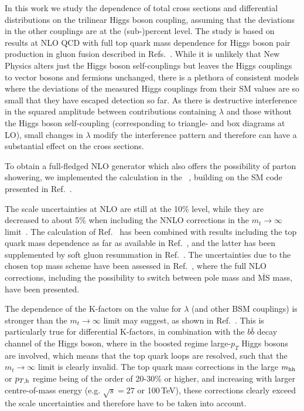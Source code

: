 \medskip

In this work we study the dependence of total cross sections and differential distributions on the trilinear Higgs boson coupling, assuming that the deviations in the other couplings are at the (sub-)percent level.
The study is based on results at NLO QCD with full top quark mass dependence for Higgs boson pair production in gluon fusion described in Refs.~\cite{Borowka:2016ehy,Borowka:2016ypz}. 
While it is unlikely that New Physics alters just the Higgs boson self-couplings but leaves the Higgs couplings to vector bosons and fermions unchanged, there is a plethora of consistent models where the deviations of the measured Higgs couplings from their SM values are so small that they have escaped detection so far. 
As there is destructive interference in the squared amplitude between contributions containing $\lambda$ and those without the Higgs boson self-coupling (corresponding to triangle- and box diagrams at LO), 
small changes in $\lambda$ modify the interference pattern and therefore can have a substantial effect on the cross sections.

To obtain a full-fledged NLO generator which also offers the possibility of parton showering, we implemented the calculation in the 
\powhegbox~\cite{Nason:2004rx,Frixione:2007vw,Alioli:2010xd}, building on the SM code presented in Ref.~\cite{Heinrich:2017kxx}.

The scale uncertainties at NLO are still at the 10\% level, while they are decreased to about 5\% when including the NNLO corrections
in the $m_t\to\infty$ limit~\cite{deFlorian:2013jea,Grigo:2015dia,deFlorian:2016uhr}. The calculation of Ref.~\cite{deFlorian:2016uhr} has been combined with results including the top quark mass dependence as far as available in Ref.~\cite{Grazzini:2018bsd}, and the latter has been supplemented by soft gluon resummation in Ref.~\cite{deFlorian:2018tah}. 
The uncertainties due to the chosen top mass scheme have been assessed in Ref.~\cite{Baglio:2018lrj}, where the full NLO corrections, including the possibility to switch between pole mass and $\overline{\mathrm{MS}}$ mass, have been presented.

The dependence of the K-factors on the value for $\lambda$ (and other BSM couplings) is stronger than the $m_t\to\infty$ limit may suggest, as shown in Ref.~\cite{Buchalla:2018yce}. This is particularly true for differential K-factors, 
in combination with the $b\bar{b}$ decay channel of the Higgs boson, where in the boosted regime large-$p_T$ Higgs bosons are involved, which means that the top quark loops are resolved, such that the  $m_t\to\infty$ limit is clearly invalid.
The top quark mass corrections in the large $m_{\mathrm{hh}}$ or $p_{T,\mathrm{h}}$ regime being of the order of 20-30\% or higher, and increasing with larger centre-of-mass energy (e.g. $\sqrt{s}=27$ or 100\,TeV), these corrections clearly exceed the scale uncertainties and therefore have to be taken into account.

